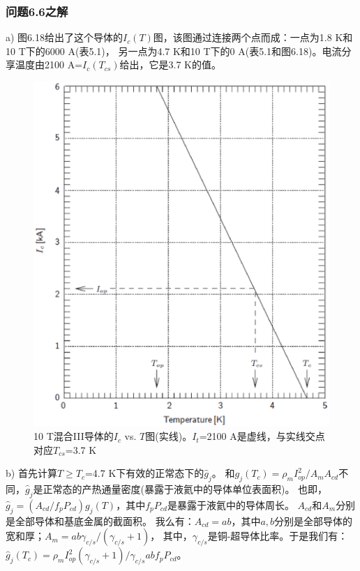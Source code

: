 \subsubsection{问题6.6之解}
a) 图6.18给出了这个导体的$I_c(T)$图，该图通过连接两个点而成：一点为1.8 K和10 T下的6000 A(表5.1)，
另一点为4.7 K和10 T下的0 A(表5.1和图6.18)。电流分享温度由2100 A=$I_c(T_{cs})$给出，它是3.7 K的值。
\begin{figure}[htbp]
	\centering
	\includegraphics[scale=0.7]{chpt6/figs/fig6.18.eps}
	\caption{10 T混合III导体的$I_c$ vs. $T$图(实线)。$I_t$=2100 A是虚线，与实线交点对应$T_{cs}$=3.7 K}
\end{figure}

b) 首先计算$T\ge T_c$=4.7 K下有效的正常态下的$\hat{g}_j$。
和$g_j(T_c)=\rho_m I_{op}^2/A_m A_{cd}$不同，$\hat{g}_j$是正常态的产热通量密度(暴露于液氦中的导体单位表面积)。
也即，$\hat{g}_j=(A_{cd}/f_pP_{cd})g_j(T)$，其中$f_p P_{cd}$是暴露于液氦中的导体周长。
$A_{cd}$和$A_{m}$分别是全部导体和基底金属的截面积。
我么有：$A_{cd}=ab$，其中$a,b$分别是全部导体的宽和厚；$A_{m}=ab\gamma_{c/s}/(\gamma_{c/s}+1)$，
其中，$\gamma_{c/s}$是铜-超导体比率。于是我们有：$\hat{g}_j(T_c)=\rho_m I_{op}^2(\gamma_{c/s}+1)/\gamma_{c/s}abf_p P_{cd}$。

